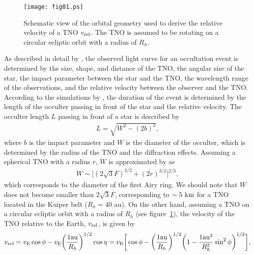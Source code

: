 \documentclass{pasj01}
\newcommand{\void}[1]{}
\renewcommand{\textcolor}{\void}
\begin{document}
\begin{figure}[!t]
\begin{center}
 \texttt{[image: fig01.ps]}
   \caption{Schematic view of  the orbital geometry used to derive the relative velocity of a TNO $v_{\rm rel}$. 
   The TNO is assumed to be rotating on a circular ecliptic orbit with a radius of $R_h$.}
   \label{fig01}
 \end{center}
\end{figure}


As described in detail by \citet{nihei07}, the observed light curve for an occultation event is 
determined by the size, shape, and distance of the TNO, the angular size of the star, 
the impact parameter between the star and the TNO, 
the wavelength range of the observations, and the relative velocity between the observer and the TNO.
According to the simulations by \citet{nihei07},
the duration of the event is determined by the length of the occulter passing in front of the star
and the relative velocity.
The occulter length $L$ passing in front of a star is described by
\begin{eqnarray}
L = \sqrt{W^2 - (2b)^2},
\end{eqnarray}
where $b$ is the impact parameter and $W$ is the diameter of the occulter, 
which is determined by the %
\textcolor{red}{
radius
}
of the TNO and the diffraction effects.
Assuming a spherical TNO with a %
\textcolor{red}{
radius $r$,
}
$W$ is approximated by \citet{nihei07} as
\begin{eqnarray}
W \sim \bigg[ (2\sqrt{3}F)^{3/2} +  (\textcolor{red}{2 r})^{3/2} \bigg]^{2/3},
\end{eqnarray}
which corresponds to the diameter of the first Airy ring.
We should note that $W$ does not become 
smaller than $2\sqrt{3}F$, corresponding to $\sim 5\ {\rm km}$ for a TNO 
located in the Kuiper belt ($R_h = 40$ au).
On the other hand,
assuming a TNO on a circular ecliptic orbit with a radius of $R_h$
(see figure~\ref{fig01}),
 the velocity of the TNO relative to the Earth, $v_{\rm rel}$, is given by
\begin{eqnarray}
v_{\rm rel} = v_{\rm E} \cos{\phi} - v_{\rm E} \bigg( \frac{1 {\rm au}}{R_h} \bigg)^{1/2} \cos{\eta}
 = v_{\rm E} \bigg[ \cos{\phi} - \bigg( \frac{1 {\rm au}}{R_h} \bigg)^{1/2} \bigg(1 -  \frac{1 {\rm au}^2}{R_h^2} \sin^2{\phi} \bigg)^{1/2} \bigg],
\end{eqnarray}
\end{document}

